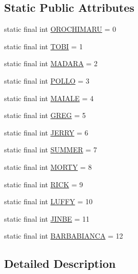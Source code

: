 \subsection*{Static Public Attributes}
\begin{DoxyCompactItemize}
\item 
static final int \hyperlink{classhelpz_1_1_constants_1_1_enemy_acdafc8dbe004b87356e2816e585ae7e4}{O\+R\+O\+C\+H\+I\+M\+A\+RU} = 0
\item 
static final int \hyperlink{classhelpz_1_1_constants_1_1_enemy_aea388f74af27e1c02b2ddb424a3818f7}{T\+O\+BI} = 1
\item 
static final int \hyperlink{classhelpz_1_1_constants_1_1_enemy_aa48b9dd67be0cf9a46c19dfdec636693}{M\+A\+D\+A\+RA} = 2
\item 
static final int \hyperlink{classhelpz_1_1_constants_1_1_enemy_a532f33a8adb18a37b58ee0541aa0c30a}{P\+O\+L\+LO} = 3
\item 
static final int \hyperlink{classhelpz_1_1_constants_1_1_enemy_abbbefc483274c1e852517d78ccf8a8ee}{M\+A\+I\+A\+LE} = 4
\item 
static final int \hyperlink{classhelpz_1_1_constants_1_1_enemy_ac53822215815bd4748310ec82953dd1a}{G\+R\+EG} = 5
\item 
static final int \hyperlink{classhelpz_1_1_constants_1_1_enemy_ab4403fec103cc840bb5ab0dc98fa7028}{J\+E\+R\+RY} = 6
\item 
static final int \hyperlink{classhelpz_1_1_constants_1_1_enemy_ae6a7b55214a2f45d76947ebe4e44d7c7}{S\+U\+M\+M\+ER} = 7
\item 
static final int \hyperlink{classhelpz_1_1_constants_1_1_enemy_a9dbcb2364394b6ffb9959fc218714e2a}{M\+O\+R\+TY} = 8
\item 
static final int \hyperlink{classhelpz_1_1_constants_1_1_enemy_a891f203987913e75a23de5b60aa93705}{R\+I\+CK} = 9
\item 
static final int \hyperlink{classhelpz_1_1_constants_1_1_enemy_aca2bfdb8e76706fe98f9068253a9b1a5}{L\+U\+F\+FY} = 10
\item 
static final int \hyperlink{classhelpz_1_1_constants_1_1_enemy_ab462287d307ee854c7c1df636aaaf1a4}{J\+I\+N\+BE} = 11
\item 
static final int \hyperlink{classhelpz_1_1_constants_1_1_enemy_a843c875dde508da3c70f72c4ddc578e8}{B\+A\+R\+B\+A\+B\+I\+A\+N\+CA} = 12
\end{DoxyCompactItemize}


\subsection{Detailed Description}


